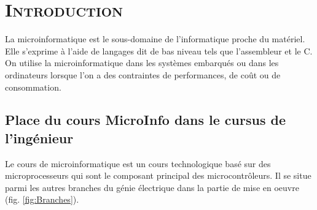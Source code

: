 
\chapter{\textsc{Introduction}}
\label{Chapter1} %




La microinformatique est le sous-domaine de l'informatique proche du matériel. Elle s'exprime à l'aide de langages dit de bas niveau tels que l'assembleur et le C. On utilise la microinformatique dans les systèmes embarqués ou dans les ordinateurs lorsque l'on a des contraintes de performances, de coût ou de consommation.

\section{Place du cours MicroInfo dans le cursus de l'ingénieur}

Le cours de microinformatique est un cours technologique basé sur des microprocesseurs qui sont le composant principal des microcontrôleurs.  Il se situe parmi les autres branches du génie électrique dans la partie de mise en oeuvre (fig. \ref{fig:Branches}).

